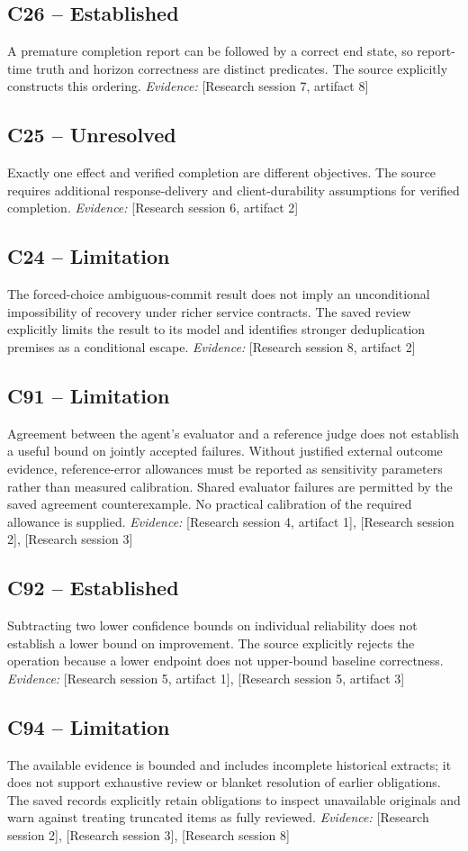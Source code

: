 \documentclass[11pt]{article}
\begin{document}
\begin{sloppypar}
\subsection{C26 -- Established}
A premature completion report can be followed by a correct end state, so report-time truth and horizon correctness are distinct predicates.
The source explicitly constructs this ordering.
\textit{Evidence: }[Research session 7, artifact 8]
\subsection{C25 -- Unresolved}
Exactly one effect and verified completion are different objectives.
The source requires additional response-delivery and client-durability assumptions for verified completion.
\textit{Evidence: }[Research session 6, artifact 2]
\subsection{C24 -- Limitation}
The forced-choice ambiguous-commit result does not imply an unconditional impossibility of recovery under richer service contracts.
The saved review explicitly limits the result to its model and identifies stronger deduplication premises as a conditional escape.
\textit{Evidence: }[Research session 8, artifact 2]
\subsection{C91 -- Limitation}
Agreement between the agent's evaluator and a reference judge does not establish a useful bound on jointly accepted failures. Without justified external outcome evidence, reference-error allowances must be reported as sensitivity parameters rather than measured calibration.
Shared evaluator failures are permitted by the saved agreement counterexample. No practical calibration of the required allowance is supplied.
\textit{Evidence: }[Research session 4, artifact 1], [Research session 2], [Research session 3]
\subsection{C92 -- Established}
Subtracting two lower confidence bounds on individual reliability does not establish a lower bound on improvement.
The source explicitly rejects the operation because a lower endpoint does not upper-bound baseline correctness.
\textit{Evidence: }[Research session 5, artifact 1], [Research session 5, artifact 3]
\subsection{C94 -- Limitation}
The available evidence is bounded and includes incomplete historical extracts; it does not support exhaustive review or blanket resolution of earlier obligations.
The saved records explicitly retain obligations to inspect unavailable originals and warn against treating truncated items as fully reviewed.
\textit{Evidence: }[Research session 2], [Research session 3], [Research session 8]

\end{sloppypar}
\end{document}
